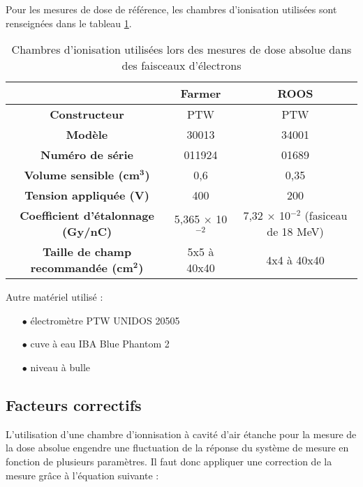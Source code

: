 \documentclass{article}
\begin{document}
Pour les mesures de dose de référence, les chambres d'ionisation utilisées sont renseignées dans le tableau \ref*{table_matos_chambres}.

\begin{table}[h]
  \centering
  \begin{tabular}{c|c|c|}
  \cline{2-3}
  \textbf{} & \textbf{Farmer} & \textbf{ROOS} \\ \hline
  \multicolumn{1}{|c|}{\textbf{Constructeur}} & PTW & PTW \\
  \multicolumn{1}{|c|}{\textbf{Modèle}} & 30013 & 34001 \\
  \multicolumn{1}{|c|}{\textbf{Numéro de série}} & 011924 & 01689 \\
  \multicolumn{1}{|c|}{\textbf{Volume sensible (cm}$\mathbf{^3}$\textbf{)}} & 0,6 & 0,35 \\
  \multicolumn{1}{|c|}{\textbf{Tension appliquée (V)}} & 400 & 200 \\
  \multicolumn{1}{|c|}{\textbf{Coefficient d'étalonnage (Gy/nC)}} & 5,365 $\times$ 10$^{-2}$ & 7,32 $\times$ 10$^{-2}$ (fasiceau de 18 MeV)\\
  \multicolumn{1}{|c|}{\textbf{Taille de champ recommandée (cm}$\mathbf{^2}$\textbf{)}} & 5x5 à 40x40 & 4x4 à 40x40 \\ \hline
  \end{tabular}
  \caption{Chambres d'ionisation utilisées lors des mesures de dose absolue dans des faisceaux d'électrons}
  \label{table_matos_chambres}
\end{table}

Autre matériel utilisé :

\begin{itemize}
  \item[$\bullet$] électromètre PTW UNIDOS 20505
  \item[$\bullet$] cuve à eau IBA Blue Phantom 2
  \item[$\bullet$] niveau à bulle
\end{itemize}

\subsection{Facteurs correctifs}

L'utilisation d'une chambre d'ionnisation à cavité d'air étanche pour la mesure de la dose absolue engendre une fluctuation de la réponse du système de mesure en fonction de plusieurs paramètres. Il faut donc appliquer une correction de la mesure grâce à l'équation suivante :
\end{document}
